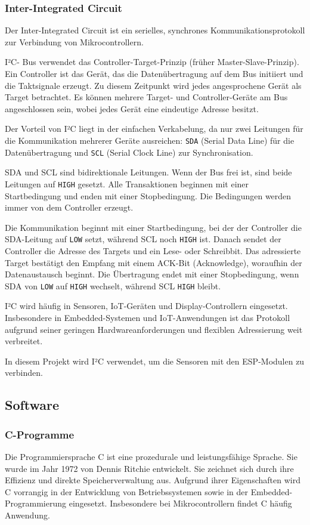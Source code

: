 \documentclass[12pt, letterpaper]{article}
\begin{document}
  \subsubsection{Inter-Integrated Circuit}
  \par Der Inter-Integrated Circuit \cite{i2c} ist ein serielles, synchrones Kommunikationsprotokoll zur Verbindung von Mikrocontrollern.
  \par I²C- Bus verwendet das Controller-Target-Prinzip (früher Master-Slave-Prinzip). Ein Controller ist das Gerät, das die Datenübertragung auf dem Bus initiiert und die Taktsignale erzeugt. Zu diesem Zeitpunkt wird jedes angesprochene Gerät als Target betrachtet. Es können mehrere Target- und Controller-Geräte am Bus angeschlossen sein, wobei jedes Gerät eine eindeutige Adresse besitzt.
  \par Der Vorteil von I²C liegt in der einfachen Verkabelung, da nur zwei Leitungen für die Kommunikation mehrerer Geräte ausreichen: \texttt{SDA} (Serial Data Line) für die Datenübertragung und \texttt{SCL} (Serial Clock Line) zur Synchronisation.
  \par SDA und SCL sind bidirektionale Leitungen. Wenn der Bus frei ist, sind beide Leitungen auf \texttt{HIGH} gesetzt. Alle Transaktionen beginnen mit einer Startbedingung und enden mit einer Stopbedingung. Die Bedingungen werden immer von dem Controller erzeugt. 
  \par Die Kommunikation beginnt mit einer Startbedingung, bei der der Controller die SDA-Leitung auf \texttt{LOW} setzt, während SCL noch \texttt{HIGH} ist. Danach sendet der Controller die Adresse des Targets und ein Lese- oder Schreibbit. Das adressierte Target bestätigt den Empfang mit einem ACK-Bit (Acknowledge), woraufhin der Datenaustausch beginnt. Die Übertragung endet mit einer Stopbedingung, wenn SDA von \texttt{LOW} auf \texttt{HIGH} wechselt, während SCL \texttt{HIGH} bleibt.
  \par I²C wird häufig in Sensoren, IoT-Geräten und Display-Controllern eingesetzt. Insbesondere in Embedded-Systemen und IoT-Anwendungen ist das Protokoll aufgrund seiner geringen Hardwareanforderungen und flexiblen Adressierung weit verbreitet.
  \par In diesem Projekt wird I²C verwendet, um die Sensoren mit den ESP-Modulen zu verbinden.
  \subsection{Software}
  \subsubsection{C-Programme}
  \par Die Programmiersprache C ist eine prozedurale und leistungsfähige Sprache. Sie wurde im Jahr 1972 von Dennis Ritchie entwickelt. Sie zeichnet sich durch ihre Effizienz und direkte Speicherverwaltung aus. Aufgrund ihrer Eigenschaften wird C vorrangig in der Entwicklung von Betriebssystemen sowie in der Embedded-Programmierung eingesetzt. Insbesondere bei Mikrocontrollern findet C häufig Anwendung.
\end{document}
